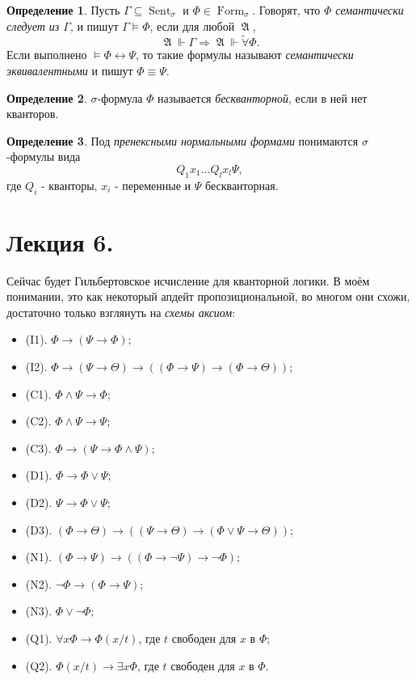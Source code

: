 \documentclass[a4paper,100pt]{article}
\theoremstyle{indented}
\theoremstyle{definition}
\newtheorem{defn}{Определение}
\theoremstyle{remark}
\DeclareMathOperator{\form}{Form}
\DeclareMathOperator{\Sent}{Sent}
\DeclareMathOperator{\GA}{\mathfrak{A}}
\begin{document}
\begin{defn}
  Пусть $\Gamma \subseteq \Sent_\sigma$ и $\Phi \in \form_\sigma$. Говорят, что \textit{$\Phi$ семантически следует из $\Gamma$}, и пишут $\Gamma \vDash \Phi$, если для любой $\GA$, 
  \[
    \GA \Vdash \Gamma \Longrightarrow \GA \Vdash \tilde{\forall}\Phi. 
  \]
  Если выполнено $\vDash \Phi \leftrightarrow \Psi$, то такие формулы называют \textit{семантически эквивалентными} и пишут $\Phi \equiv \Psi$. 
\end{defn}

\begin{defn}
  $\sigma$-формула $\Phi$ называется \textit{бескванторной}, если в ней нет кванторов.
\end{defn}

\begin{defn}
  Под \textit{пренексными нормальными формами} понимаются $\sigma$-формулы вида 
  \[
    Q_1 x_1 \ldots Q_l x_l \Psi,
  \]
  где $Q_i$ - кванторы, $x_i$ - переменные и $\Psi$ бескванторная.
\end{defn}

\section{Лекция 6.}

Сейчас будет Гильбертовское исчисление для кванторной логики. В моём понимании, это как некоторый апдейт пропозициональной, во многом они схожи, достаточно только взглянуть на \textit{схемы аксиом}:

\begin{itemize}
  \item (I1). $\Phi\rightarrow (\Psi\rightarrow \Phi)$;
  \item (I2). $\Phi\rightarrow (\Psi\rightarrow \Theta)\rightarrow((\Phi\rightarrow \Psi)\rightarrow (\Phi\rightarrow \Theta))$; 
  \item (C1). $\Phi \wedge \Psi \rightarrow \Phi$; 
  \item (C2). $\Phi \wedge \Psi \rightarrow \Psi$; 
  \item (C3). $\Phi\rightarrow (\Psi \rightarrow \Phi \wedge \Psi)$;
  \item (D1). $\Phi\rightarrow \Phi \vee\Psi$;
  \item (D2). $\Psi\rightarrow \Phi \vee \Psi$; 
  \item (D3). $(\Phi\rightarrow \Theta)\rightarrow((\Psi\rightarrow \Theta)\rightarrow (\Phi\vee\Psi\rightarrow\Theta))$;
  \item (N1). $(\Phi\rightarrow \Psi)\rightarrow((\Phi\rightarrow \neg \Psi)\rightarrow \neg \Phi)$; 
  \item (N2). $\neg\Phi \rightarrow (\Phi\rightarrow \Psi)$; 
  \item (N3). $\Phi \vee \neg \Phi$;
  \item (Q1). $\forall x \Phi \rightarrow \Phi(x/t)$, где $t$ свободен для $x$ в $\Phi$;
  \item (Q2). $\Phi(x/t)\rightarrow \exists x \Phi$, где $t$ свободен для $x$ в $\Phi$. 
\end{itemize}
\end{document}
